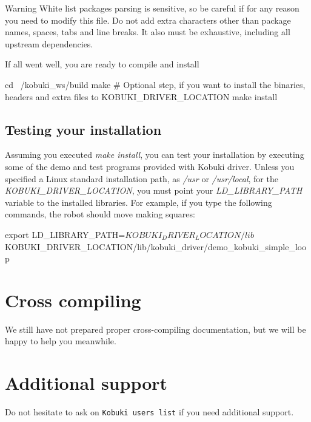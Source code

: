 \begin{DoxyWarning}{\-Warning}
\-White list packages parsing is sensitive, so be careful if for any reason you need to modify this file. \-Do not add extra characters other than package names, spaces, tabs and line breaks. \-It also must be exhaustive, including all upstream dependencies.
\end{DoxyWarning}



\-If all went well, you are ready to compile and install


\begin{DoxyCode}
  cd ~/kobuki_ws/build
  make
  # Optional step, if you want to install the binaries, headers and extra files
       to KOBUKI_DRIVER_LOCATION
  make install 
\end{DoxyCode}
\subsection{\-Testing your installation}\label{enInstallationLinuxGuide_test}
\-Assuming you executed {\itshape make install\/}, you can test your installation by executing some of the demo and test programs provided with \-Kobuki driver. \-Unless you specified a \-Linux standard installation path, as {\itshape /usr\/} or {\itshape /usr/local\/}, for the {\itshape \-K\-O\-B\-U\-K\-I\-\_\-\-D\-R\-I\-V\-E\-R\-\_\-\-L\-O\-C\-A\-T\-I\-O\-N\/}, you must point your {\itshape \-L\-D\-\_\-\-L\-I\-B\-R\-A\-R\-Y\-\_\-\-P\-A\-T\-H\/} variable to the installed libraries. \-For example, if you type the following commands, the robot should move making squares\-:


\begin{DoxyCode}
  export LD_LIBRARY_PATH=$KOBUKI_DRIVER_LOCATION/lib
  $KOBUKI_DRIVER_LOCATION/lib/kobuki_driver/demo_kobuki_simple_loop
\end{DoxyCode}
\section{\-Cross compiling}\label{enInstallationLinuxGuide_crossc}
\-We still have not prepared proper cross-\/compiling documentation, but we will be happy to help you meanwhile.\section{\-Additional support}\label{enInstallationLinuxGuide_support}
\-Do not hesitate to ask on {\tt \-Kobuki users list} if you need additional support. 
